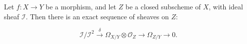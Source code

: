 Let $f: X \to Y$ be a morphism, and let $Z$ be a closed subscheme of $X$, with ideal sheaf $\mathcal{I}$. Then there is an exact sequence of sheaves on $Z$:

$$\mathcal{I}/\mathcal{I}^2 \xrightarrow{\delta} \Omega_{X/Y} \otimes \mathcal{O}_Z \to \Omega_{Z/Y} \to 0.$$
